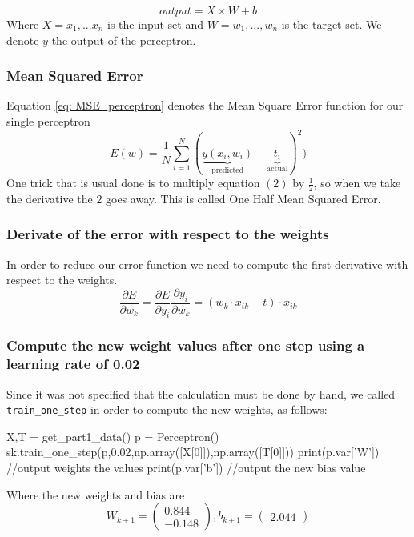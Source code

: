 \documentclass[11pt]{article}
\begin{document}
\begin{equation}
\label{eq:vectorized_perceptron}
output = X\times W + b
\end{equation}
Where $X = {x_1, ... x_n}$ is the input set and $W = {w_1, ..., w_n}$ is the target set. We denote $y$ the output of the perceptron.

\subsubsection{Mean Squared Error}
Equation \ref{eq: MSE_perceptron} denotes the Mean Square Error function for our single perceptron
\begin{equation}
\label{eq: MSE_perceptron}
	E(w) = \frac{1}{N}\sum_{i = 1}^N(\underbrace{y(x_i,w_i)}_{\text{predicted}} - \underbrace{t_i}_{\text{actual}})^2)
\end{equation}
One trick that is usual done is to multiply equation $(2)$ by $\frac{1}{2}$, so when we take the derivative the $2$ goes away. This is called One Half Mean Squared Error.

\subsubsection{Derivate of the error with respect to the weights}
In order to reduce our error function we need to compute the first derivative with respect to the weights.\begin{equation}
\frac{\partial E}{\partial w_k}	=\frac{\partial E}{\partial y_i}\frac{\partial y_i}{\partial w_k} =  (w_k \cdot x_{ik} - t) \cdot x_{ik}
\end{equation}
\subsubsection{Compute the new weight values after one step using a learning rate of 0.02}
Since it was not specified that the calculation must be done by hand, we called \texttt{train\_one\_step} in order to compute the new weights, as follows:
\begin{python}
X,T = get_part1_data()
p = Perceptron()
sk.train_one_step(p,0.02,np.array([X[0]]),np.array([T[0]]))
print(p.var['W']) //output weights the values	
print(p.var['b']) //output the new bias value
\end{python}
Where the new weights and bias are
$$W_{k + 1} = \begin{pmatrix}
 0.844 \\
 -0.148
\end{pmatrix}, b_{k+1} = \begin{pmatrix}
	2.044
\end{pmatrix}$$
\end{document}
